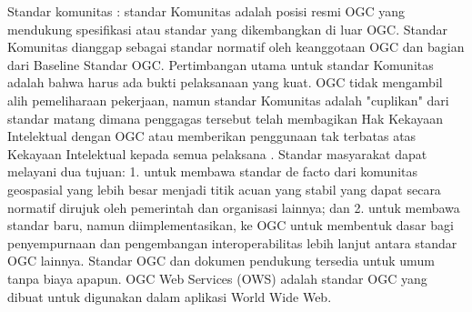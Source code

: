 Standar komunitas : standar Komunitas adalah posisi resmi OGC yang mendukung spesifikasi atau standar yang dikembangkan di luar OGC. Standar Komunitas dianggap sebagai standar normatif oleh keanggotaan OGC dan bagian dari Baseline Standar OGC. Pertimbangan utama untuk standar Komunitas adalah bahwa harus ada bukti pelaksanaan yang kuat. OGC tidak mengambil alih pemeliharaan pekerjaan, namun standar Komunitas adalah "cuplikan" dari standar matang dimana penggagas tersebut telah membagikan Hak Kekayaan Intelektual dengan OGC atau memberikan penggunaan tak terbatas atas Kekayaan Intelektual kepada semua pelaksana .
Standar masyarakat dapat melayani dua tujuan:
1.	untuk membawa standar de facto dari komunitas geospasial yang lebih besar menjadi titik acuan yang stabil yang dapat secara normatif dirujuk oleh pemerintah dan organisasi lainnya; dan
2.	untuk membawa standar baru, namun diimplementasikan, ke OGC untuk membentuk dasar bagi penyempurnaan dan pengembangan interoperabilitas lebih lanjut antara standar OGC lainnya.
Standar OGC dan dokumen pendukung tersedia untuk umum tanpa biaya apapun.
OGC Web Services (OWS) adalah standar OGC yang dibuat untuk digunakan dalam aplikasi World Wide Web.

